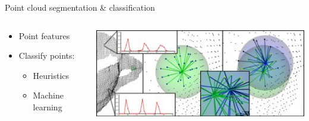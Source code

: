 \documentclass{beamer}
\begin{document}
\begin{frame}{Point cloud segmentation \& classification}

\begin{columns}[T]
\begin{column}{0.5\textwidth}

\begin{itemize}
\item Point features

\item Classify points:
\begin{itemize}
\item Heuristics
\item Machine learning
\end{itemize}
\end{itemize}

\end{column}

\begin{column}{0.5\textwidth}

\includegraphics[width=1\textwidth]{pics/features.png}

\end{column}
\end{columns}
\end{frame}
\end{document}
